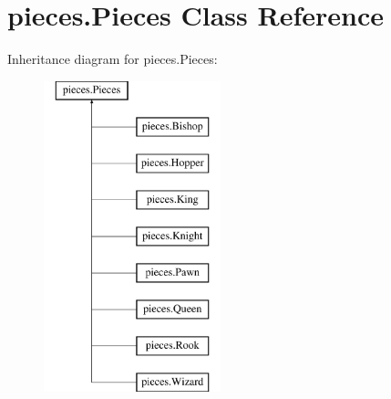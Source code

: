 \hypertarget{classpieces_1_1_pieces}{}\section{pieces.\+Pieces Class Reference}
\label{classpieces_1_1_pieces}
Inheritance diagram for pieces.\+Pieces\+:\begin{figure}[H]
\begin{center}
\leavevmode
\includegraphics[height=9.000000cm]{classpieces_1_1_pieces}
\end{center}
\end{figure}
